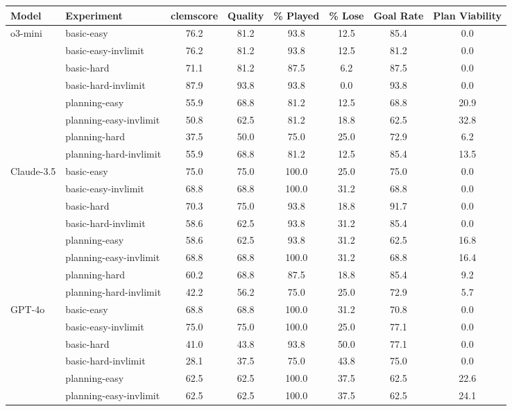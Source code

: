 \begin{tabular}{llcccccc}
\hline
Model & Experiment &  clemscore & Quality & \% Played & \% Lose & Goal Rate & Plan Viability \\
\hline
\multirow[c]{8}{*}{o3-mini} & basic-easy & 76.2 & 81.2 & 93.8 & 12.5 & 85.4 & 0.0 \\
 & basic-easy-invlimit & 76.2 & 81.2 & 93.8 & 12.5 & 81.2 & 0.0 \\
 & basic-hard & 71.1 & 81.2 & 87.5 & 6.2 & 87.5 & 0.0 \\
 & basic-hard-invlimit & 87.9 & 93.8 & 93.8 & 0.0 & 93.8 & 0.0 \\
 & planning-easy & 55.9 & 68.8 & 81.2 & 12.5 & 68.8 & 20.9 \\
 & planning-easy-invlimit & 50.8 & 62.5 & 81.2 & 18.8 & 62.5 & 32.8 \\
 & planning-hard & 37.5 & 50.0 & 75.0 & 25.0 & 72.9 & 6.2 \\
 & planning-hard-invlimit & 55.9 & 68.8 & 81.2 & 12.5 & 85.4 & 13.5 \\
 \cline{1-8}
\multirow[c]{8}{*}{Claude-3.5} & basic-easy & 75.0 & 75.0 & 100.0 & 25.0 & 75.0 & 0.0 \\
 & basic-easy-invlimit & 68.8 & 68.8 & 100.0 & 31.2 & 68.8 & 0.0 \\
 & basic-hard & 70.3 & 75.0 & 93.8 & 18.8 & 91.7 & 0.0 \\
 & basic-hard-invlimit & 58.6 & 62.5 & 93.8 & 31.2 & 85.4 & 0.0 \\
 & planning-easy & 58.6 & 62.5 & 93.8 & 31.2 & 62.5 & 16.8 \\
 & planning-easy-invlimit & 68.8 & 68.8 & 100.0 & 31.2 & 68.8 & 16.4 \\
 & planning-hard & 60.2 & 68.8 & 87.5 & 18.8 & 85.4 & 9.2 \\
 & planning-hard-invlimit & 42.2 & 56.2 & 75.0 & 25.0 & 72.9 & 5.7 \\
\cline{1-8}
\multirow[c]{8}{*}{GPT-4o} & basic-easy & 68.8 & 68.8 & 100.0 & 31.2 & 70.8 & 0.0 \\
 & basic-easy-invlimit & 75.0 & 75.0 & 100.0 & 25.0 & 77.1 & 0.0 \\
 & basic-hard & 41.0 & 43.8 & 93.8 & 50.0 & 77.1 & 0.0 \\
 & basic-hard-invlimit & 28.1 & 37.5 & 75.0 & 43.8 & 75.0 & 0.0 \\
 & planning-easy & 62.5 & 62.5 & 100.0 & 37.5 & 62.5 & 22.6 \\
 & planning-easy-invlimit & 62.5 & 62.5 & 100.0 & 37.5 & 62.5 & 24.1 \\

\end{tabular}
